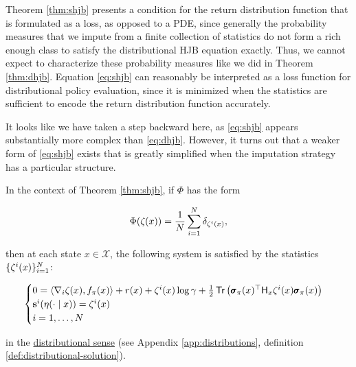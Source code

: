 Theorem \ref{thm:shjb} presents a condition for the return
distribution function that is formulated as a loss, as opposed to a
PDE, since generally the probability measures that we impute from a
finite collection of statistics do not form a rich enough class to
satisfy the distributional HJB equation exactly. Thus, we cannot
expect to characterize these probability measures like we
did in Theorem \ref{thm:dhjb}. Equation \eqref{eq:shjb} can reasonably
be interpreted as a loss function for distributional policy
evaluation, since it is minimized when the statistics are sufficient to
encode the return distribution function accurately.

It looks like we have taken a step backward here, as
\eqref{eq:shjb} appears substantially more complex than
\eqref{eq:dhjb}. However, it turns out that a weaker form of
\eqref{eq:shjb} exists that is greatly simplified when the imputation
strategy has a particular structure.

\begin{corollary}
  \label{cor:shjb}
  In the context of Theorem \ref{thm:shjb}, if $\Phi$ has the form

  \begin{equation}\label{eq:rep:dirac}
    \Phi(\zeta_{}(x)) = \frac{1}{N}\sum_{i=1}^N\delta_{\zeta_{}^i(x)},
  \end{equation}

  then at each state $x\in\mathcal{X}$, the following system is satisfied by the statistics $\{\zeta_{}^i(x)\}_{i=1}^N$:

  \begin{equation}
    \label{eq:shjb:dirac}
    \begin{cases}
      0
      = \left\langle\nabla_i\statistics(x), f_\pi(x)\right\rangle +
        r(x) + \statistics^i(x)\log\gamma +
        \frac{1}{2}\trace\left(\quadraticform{\pmb{\sigma}_\pi(x)}{\hessian{x}\statistics^i(x)}\right)\\
      \mathbf{s}^i(\returnmeasure(\cdot\mid x)) = \statistics^i(x)\\
      i = 1,\dots,N\\
    \end{cases}
  \end{equation}

  in the \hyperref[def:distributional-derivative]{distributional sense} (see
  Appendix \ref{app:distributions}, definition
  \ref{def:distributional-solution}).
\end{corollary}

\newcommand{\xxX}{\mathcal{X}}
\newcommand{\xxf}{f_\pi}
\newcommand{\xxs}{\pmb{\sigma}_\pi}
\newcommand{\R}{\mathbf{R}}
\newcommand{\norm}[1]{\left\|#1\right\|}

